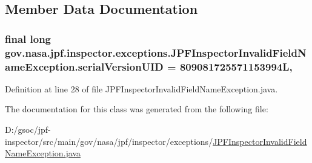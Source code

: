 \subsection{Member Data Documentation}
\subsubsection[{\texorpdfstring{serial\+Version\+U\+ID}{serialVersionUID}}]{\setlength{\rightskip}{0pt plus 5cm}final long gov.\+nasa.\+jpf.\+inspector.\+exceptions.\+J\+P\+F\+Inspector\+Invalid\+Field\+Name\+Exception.\+serial\+Version\+U\+ID = 809081725571153994L\hspace{0.3cm}{\ttfamily [static]}, {\ttfamily [private]}}\hypertarget{classgov_1_1nasa_1_1jpf_1_1inspector_1_1exceptions_1_1_j_p_f_inspector_invalid_field_name_exception_a1722d817f1bc0a1b6d91a54ab152cd30}{}\label{classgov_1_1nasa_1_1jpf_1_1inspector_1_1exceptions_1_1_j_p_f_inspector_invalid_field_name_exception_a1722d817f1bc0a1b6d91a54ab152cd30}


Definition at line 28 of file J\+P\+F\+Inspector\+Invalid\+Field\+Name\+Exception.\+java.



The documentation for this class was generated from the following file\+:\begin{DoxyCompactItemize}
\item 
D\+:/gsoc/jpf-\/inspector/src/main/gov/nasa/jpf/inspector/exceptions/\hyperlink{_j_p_f_inspector_invalid_field_name_exception_8java}{J\+P\+F\+Inspector\+Invalid\+Field\+Name\+Exception.\+java}\end{DoxyCompactItemize}
